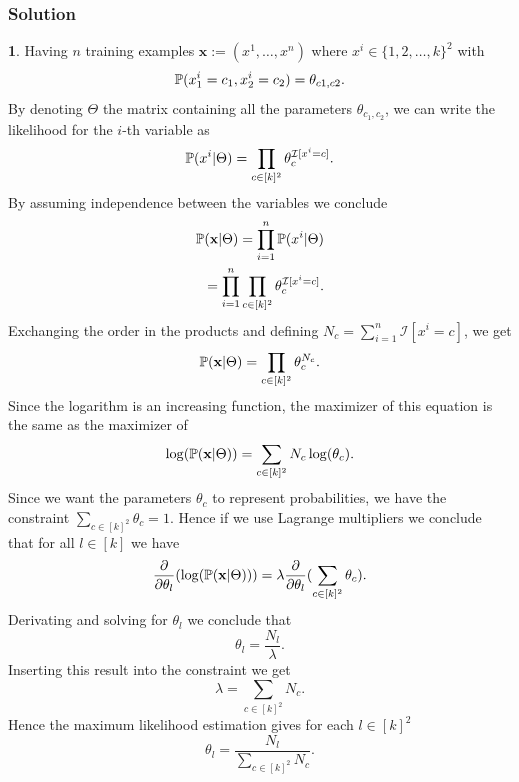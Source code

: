 \documentclass{article}
\begin{document}
\subsubsection*{Solution}
\textbf{1}. 
\newline
Having $n$ training examples $\textbf{x}:=(x^{1},\ldots,x^{n})$ where $x^{i}\in\{1,2,\ldots,k\}^{2}$ with
\begin{equation*}
\mathbb{P}(x_{1}^{i}=c_{1},x_{2}^{i}=c_{2})=\theta_{c1,c2}.
\end{equation*}
By denoting $\Theta$ the matrix containing all the parameters $\theta_{c_{1},c_{2}}$, we can write the likelihood for the $i$-th variable as
\begin{equation*}
\mathbb{P}(x^{i}|\Theta)=\prod_{c\in[k]^{2}}\theta_{c}^{\mathcal{I}[x^{i}=c]}.
\end{equation*}
By assuming independence between the variables we conclude 
\begin{eqnarray*}
\mathbb{P}(\textbf{x}|\Theta)=\prod_{i=1}^{n}\mathbb{P}(x^{i}|\Theta)\\
=\prod_{i=1}^{n}\prod_{c\in[k]^{2}}\theta_{c}^{\mathcal{I}[x^{i}=c]}.
\end{eqnarray*}
Exchanging the order in the products and defining $N_c = \sum_{i=1}^n \mathcal{I}[x^i = c]$, we get
\begin{equation}\label{eqnmle}
\mathbb{P}(\textbf{x}|\Theta)=\prod_{c\in[k]^{2}}\theta_{c}^{N_{c}}.
\end{equation}
Since the logarithm is an increasing function, the maximizer of this equation is the same as the maximizer of 
\begin{equation}\label{eqnloglikelihood}
\log(\mathbb{P}(\textbf{x}|\Theta))=\sum_{c\in[k]^{2}}N_{c}\log(\theta_{c}).
\end{equation}
Since we want the parameters $\theta_{c}$ to represent probabilities, we have the constraint $\sum_{c\in [k]^{2}}\theta_{c}=1$. Hence
if we use Lagrange multipliers we conclude that for all $l\in [k]$ we have 
\begin{equation*}
\frac{\partial}{\partial\theta_{l}}(\log(\mathbb{P}(\textbf{x}|\Theta)))=\lambda\frac{\partial}{\partial\theta_{l}}(\sum_{c\in [k]^{2}}\theta_{c}).
\end{equation*}
Derivating and solving for $\theta_{l}$ we conclude that
\begin{equation*}
\theta_{l}=\frac{N_{l}}{\lambda}.
\end{equation*}
Inserting this result into the constraint we get
\begin{equation*}
\lambda=\sum_{c\in [k]^{2}}N_c.
\end{equation*}
Hence the maximum likelihood estimation gives for each $l\in[k]^{2}$ 
\begin{equation*}
\theta_{l}=\frac{N_l}{\sum_{c\in[k]^{2}}N_c}.
\end{equation*}
\newpage
\end{document}
